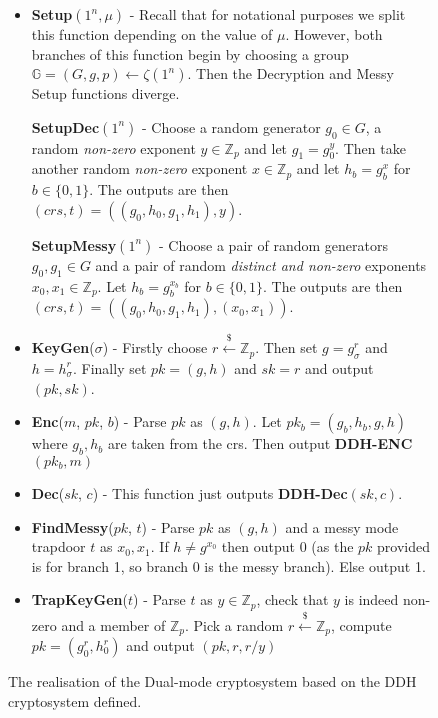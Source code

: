 \documentclass[ %
                    author={Nicholas Tutte},
                supervisor={Prof. Nigel Smart},
                    degree={MEng},
                     title={Secure Two Party Computation},
                  subtitle={A practical comparison of recent protocols},
                      type={Research - GG1K},
                      year={2015} ]{dissertation}
\begin{document}
					
					\begin{figure}[!htb]
						\begin{mdframed}
							\centering
							\begin{itemize}
								\item \textbf{Setup}$(1^n, \mu)$ - Recall that for notational purposes we split this function depending on the value of $\mu$. However, both branches of this function begin by choosing a group $\mathbb{G} = (G, g, p) \leftarrow \zeta(1^n)$. Then the Decryption and Messy Setup functions diverge.

								\textbf{SetupDec}$(1^n)$ - Choose a random generator $g_0 \in G$, a random \emph{non-zero} exponent $y \in \mathbb{Z}_p$ and let $g_1 = g_0^y$. Then take another random \emph{non-zero} exponent $x \in \mathbb{Z}_p$ and let $h_b = g_b^x$ for $b \in \{0, 1\}$. The outputs are then $(crs, t) = ( (g_0, h_0, g_1, h_1), y )$.

								\textbf{SetupMessy}$(1^n)$ - Choose a pair of random generators $g_0, g_1 \in G$ and a pair of random \emph{distinct and non-zero} exponents $x_0, x_1 \in \mathbb{Z}_p$. Let $h_b = g_b^{x_b}$ for $b \in \{0, 1\}$.  The outputs are then $(crs, t) = ( (g_0, h_0, g_1, h_1), (x_0, x_1) )$.

								\item \textbf{KeyGen}($\sigma$) - Firstly choose $r \xleftarrow{\$} \mathbb{Z}_p$. Then set $g = g_{\sigma}^r$ and  $h = h_{\sigma}^r$. Finally set $pk = (g, h)$ and $sk = r$ and output $(pk, sk)$.

								\item \textbf{Enc}($m$, $pk$, $b$) - Parse $pk$ as $(g, h)$. Let $pk_b = (g_b, h_b, g, h)$ where $g_b, h_b$ are taken from the crs. Then output \textbf{DDH-ENC}$(pk_b, m)$

								\item \textbf{Dec}($sk$, $c$) - This function just outputs \textbf{DDH-Dec}$(sk, c)$.

								\item \textbf{FindMessy}($pk$, $t$) - Parse $pk$ as $(g, h)$ and a messy mode trapdoor $t$ as $x_0, x_1$. If $h \neq g^{x_0}$ then output 0 (as the $pk$ provided is for branch 1, so branch 0 is the messy branch). Else output 1.

								\item \textbf{TrapKeyGen}($t$) - Parse $t$ as $y \in \mathbb{Z}_p$, check that $y$ is indeed non-zero and a member of $\mathbb{Z}_p$. Pick a random $r \xleftarrow{\$} \mathbb{Z}_p$, compute $pk = (g_0^r, h_0^r)$ and output $(pk, r, r / y)$
							\end{itemize}
						\end{mdframed}

						\caption{The realisation of the Dual-mode cryptosystem based on the DDH cryptosystem defined. \label{fig:PVW_DDH_Concrete_Functions}}
					\end{figure}
\end{document}
